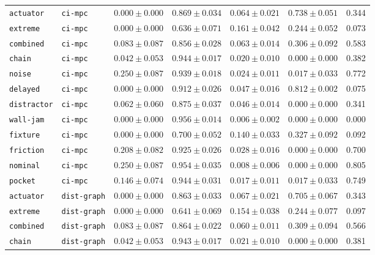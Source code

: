 \documentclass{article}
\begin{document}
\begin{center}
\begin{tabular}{llccccc}
\texttt{actuator} & \texttt{ci-mpc} & $0.000 \pm 0.000$ & $0.869 \pm 0.034$ & $0.064 \pm 0.021$ & $0.738 \pm 0.051$ & 0.344 \\
\texttt{extreme} & \texttt{ci-mpc} & $0.000 \pm 0.000$ & $0.636 \pm 0.071$ & $0.161 \pm 0.042$ & $0.244 \pm 0.052$ & 0.073 \\
\texttt{combined} & \texttt{ci-mpc} & $0.083 \pm 0.087$ & $0.856 \pm 0.028$ & $0.063 \pm 0.014$ & $0.306 \pm 0.092$ & 0.583 \\
\texttt{chain} & \texttt{ci-mpc} & $0.042 \pm 0.053$ & $0.944 \pm 0.017$ & $0.020 \pm 0.010$ & $0.000 \pm 0.000$ & 0.382 \\
\texttt{noise} & \texttt{ci-mpc} & $0.250 \pm 0.087$ & $0.939 \pm 0.018$ & $0.024 \pm 0.011$ & $0.017 \pm 0.033$ & 0.772 \\
\texttt{delayed} & \texttt{ci-mpc} & $0.000 \pm 0.000$ & $0.912 \pm 0.026$ & $0.047 \pm 0.016$ & $0.812 \pm 0.002$ & 0.075 \\
\texttt{distractor} & \texttt{ci-mpc} & $0.062 \pm 0.060$ & $0.875 \pm 0.037$ & $0.046 \pm 0.014$ & $0.000 \pm 0.000$ & 0.341 \\
\texttt{wall-jam} & \texttt{ci-mpc} & $0.000 \pm 0.000$ & $0.956 \pm 0.014$ & $0.006 \pm 0.002$ & $0.000 \pm 0.000$ & 0.000 \\
\texttt{fixture} & \texttt{ci-mpc} & $0.000 \pm 0.000$ & $0.700 \pm 0.052$ & $0.140 \pm 0.033$ & $0.327 \pm 0.092$ & 0.092 \\
\texttt{friction} & \texttt{ci-mpc} & $0.208 \pm 0.082$ & $0.925 \pm 0.026$ & $0.028 \pm 0.016$ & $0.000 \pm 0.000$ & 0.700 \\
\texttt{nominal} & \texttt{ci-mpc} & $0.250 \pm 0.087$ & $0.954 \pm 0.035$ & $0.008 \pm 0.006$ & $0.000 \pm 0.000$ & 0.805 \\
\texttt{pocket} & \texttt{ci-mpc} & $0.146 \pm 0.074$ & $0.944 \pm 0.031$ & $0.017 \pm 0.011$ & $0.017 \pm 0.033$ & 0.749 \\
\texttt{actuator} & \texttt{dist-graph} & $0.000 \pm 0.000$ & $0.863 \pm 0.033$ & $0.067 \pm 0.021$ & $0.705 \pm 0.067$ & 0.343 \\
\texttt{extreme} & \texttt{dist-graph} & $0.000 \pm 0.000$ & $0.641 \pm 0.069$ & $0.154 \pm 0.038$ & $0.244 \pm 0.077$ & 0.097 \\
\texttt{combined} & \texttt{dist-graph} & $0.083 \pm 0.087$ & $0.864 \pm 0.022$ & $0.060 \pm 0.011$ & $0.309 \pm 0.094$ & 0.566 \\
\texttt{chain} & \texttt{dist-graph} & $0.042 \pm 0.053$ & $0.943 \pm 0.017$ & $0.021 \pm 0.010$ & $0.000 \pm 0.000$ & 0.381 \\

\end{tabular}
\end{center}
\end{document}
